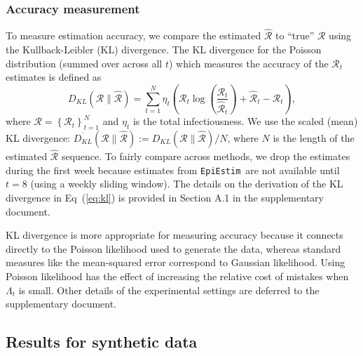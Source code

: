 \documentclass[10pt,letterpaper]{article}
\newcommand{\lr}[1]{\left(#1\right)}
\def\EpiEstim{\texttt{EpiEstim}}
\def\calR{\mathcal{R}}
\renewcommand{\eqref}[1]{Eq~(\ref{#1})}
\begin{document}
\subsubsection{Accuracy measurement}

To measure estimation accuracy, we compare the estimated $\widehat{\calR}$ to 
``true'' $\calR$ using the Kullback-Leibler (KL) divergence. The KL divergence for the
Poisson distribution (summed over across all $t$) which measures the accuracy
of the $\calR_t$ estimates is defined as
\begin{equation} \label{eq:kl}
  D_{KL}(\calR \parallel \widehat{\calR}) = \sum_{t=1}^N \eta_t \lr{\calR_t
  \log\left(\frac{\calR_t} {\widehat{\calR}_t}\right) + \widehat{\calR}_t -
{\calR}_t},
\end{equation}
where $\calR = \left\{ \calR_t \right\}_{t=1}^N$ and $\eta_t$ is the total 
infectiousness. We use the scaled (mean) KL divergence: 
$\overline{D_{KL}}(\calR \parallel \widehat{\calR}) := D_{KL}(\calR \parallel \widehat{\calR}) / N$,
where $N$ is the length of the estimated $\widehat{\calR}$ sequence.
To fairly compare across methods, we drop the estimates during the first week 
because estimates from \EpiEstim\ are not available until $t=8$ (using a weekly sliding window). 
The details on the derivation of the KL divergence in \eqref{eq:kl} is provided in
Section A.1 in the supplementary document.

KL divergence is
more appropriate for measuring accuracy because it connects directly to the
Poisson likelihood used to generate the data, whereas standard measures like the
mean-squared error correspond to Gaussian likelihood. Using Poisson likelihood
has the effect of increasing the relative cost of mistakes when $\Lambda_t$ is
small. Other details of the experimental settings are deferred to the 
supplementary document. 


\subsection{Results for synthetic data}
\end{document}
